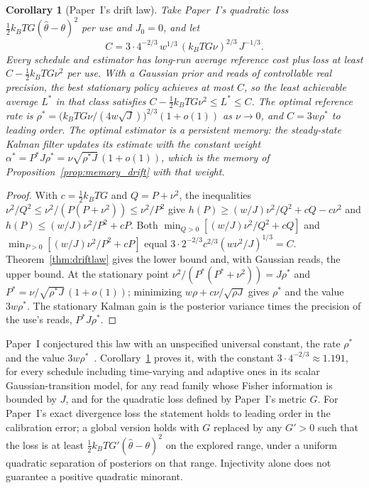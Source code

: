 \documentclass[12pt]{article}
\newtheorem{corollary}[theorem]{Corollary}
\theoremstyle{definition}
\begin{document}
\begin{corollary}[Paper~I's drift law]
\label{cor:driftlaw}
Take Paper~I's quadratic loss $\tfrac12k_BTG(\hat\theta-\theta)^2$ per use and $J_0=0$, and let
\begin{equation}
\label{eq:driftlaw_explicit}
C=3\cdot4^{-2/3}\,w^{1/3}\,(k_BTG\nu)^{2/3}\,J^{-1/3}.
\end{equation}
Every schedule and estimator has long-run average reference cost plus loss at least $C-\tfrac12k_BTG\nu^2$ per use. With a Gaussian prior and reads of controllable real precision, the best stationary policy achieves at most $C$, so the least achievable average $L^*$ in that class satisfies $C-\tfrac12k_BTG\nu^2\le L^*\le C$.
The optimal reference rate is $\rho^*=\bigl(k_BTG\nu/(4w\sqrt J)\bigr)^{2/3}(1+o(1))$ as $\nu\to0$, and $C=3w\rho^*$ to leading order. The optimal estimator is a persistent memory: the steady-state Kalman filter updates its estimate with the constant weight $\alpha^*=P^*J\rho^*=\nu\sqrt{\rho^*J}\,(1+o(1))$, which is the memory of Proposition~\ref{prop:memory_drift} with that weight.
\end{corollary}

\begin{proof}
With $c=\tfrac12k_BTG$ and $Q=P+\nu^2$, the inequalities $\nu^2/Q^2\le\nu^2/(P(P+\nu^2))\le\nu^2/P^2$ give $h(P)\ge(w/J)\nu^2/Q^2+cQ-c\nu^2$ and $h(P)\le(w/J)\nu^2/P^2+cP$. Both $\min_{Q>0}[(w/J)\nu^2/Q^2+cQ]$ and $\min_{P>0}[(w/J)\nu^2/P^2+cP]$ equal $3\cdot2^{-2/3}c^{2/3}(w\nu^2/J)^{1/3}=C$. Theorem~\ref{thm:driftlaw} gives the lower bound and, with Gaussian reads, the upper bound. At the stationary point $\nu^2/(P^*(P^*+\nu^2))=J\rho^*$ and $P^*=\nu/\sqrt{\rho^*J}\,(1+o(1))$; minimizing $w\rho+c\nu/\sqrt{\rho J}$ gives $\rho^*$ and the value $3w\rho^*$. The stationary Kalman gain is the posterior variance times the precision of the use's reads, $P^*J\rho^*$.
\end{proof}

Paper~I conjectured this law with an unspecified universal constant, the rate $\rho^*$ and the value $3w\rho^*$~\cite{Liu2026TDOME_I}. Corollary~\ref{cor:driftlaw} proves it, with the constant $3\cdot4^{-2/3}\approx1.191$, for every schedule including time-varying and adaptive ones in its scalar Gaussian-transition model, for any read family whose Fisher information is bounded by $J$, and for the quadratic loss defined by Paper~I's metric $G$. For Paper~I's exact divergence loss the statement holds to leading order in the calibration error; a global version holds with $G$ replaced by any $G'>0$ such that the loss is at least $\tfrac12k_BTG'(\hat\theta-\theta)^2$ on the explored range, under a uniform quadratic separation of posteriors on that range. Injectivity alone does not guarantee a positive quadratic minorant.
\end{document}
